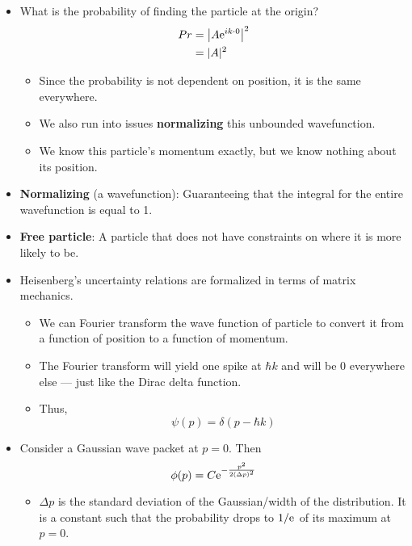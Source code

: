 \documentclass[../notes.tex]{subfiles}
\begin{document}
\begin{itemize}
\begin{itemize}
    \end{itemize}
    \item What is the probability of finding the particle at the origin?
    \begin{align*}
        Pr &= \left| A\e[ik\cdot 0] \right|^2\\
        &= |A|^2\\
    \end{align*}
    \begin{itemize}
        \item Since the probability is not dependent on position, it is the same everywhere.
        \item We also run into issues \textbf{normalizing} this unbounded wavefunction.
        \item We know this particle's momentum exactly, but we know nothing about its position.
    \end{itemize}
    \item \textbf{Normalizing} (a wavefunction): Guaranteeing that the integral for the entire wavefunction is equal to 1.
    \item \textbf{Free particle}: A particle that does not have constraints on where it is more likely to be.
    \item Heisenberg's uncertainty relations are formalized in terms of matrix mechanics.
    \begin{itemize}
        \item We can Fourier transform the wave function of particle to convert it from a function of position to a function of momentum.
        \item The Fourier transform will yield one spike at $\hbar k$ and will be 0 everywhere else --- just like the Dirac delta function.
        \item Thus,
        \begin{equation*}
            \psi(p) = \delta(p-\hbar k)
        \end{equation*}
    \end{itemize}
    \item Consider a Gaussian wave packet at $p=0$. Then
    \begin{equation*}
        \phi(p) = C\e[-\frac{p^2}{2(\Delta p)^2}]
    \end{equation*}
    \begin{itemize}
        \item $\Delta p$ is the standard deviation of the Gaussian/width of the distribution. It is a constant such that the probability drops to $1/\e$ of its maximum at $p=0$.

\end{itemize}
\end{itemize}
\end{document}
